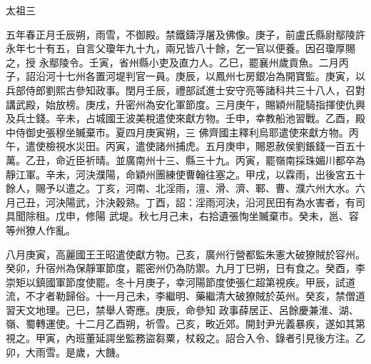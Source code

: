 
\begin{pinyinscope}

 太祖三



 五年春正月壬辰朔，雨雪，不御殿。禁鐵鑄浮屠及佛像。庚子，前盧氏縣尉鄢陵許永年七十有五，自言父瓊年九十九，兩兄皆八十餘，乞一官以便養。因召瓊厚賜之，授
 永鄢陵令。壬寅，省州縣小吏及直力人。乙巳，罷襄州歲貢魚。二月丙子，詔沿河十七州各置河堤判官一員。庚辰，以鳳州七房銀冶為開寶監。庚寅，以兵部侍郎劉熙古參知政事。閏月壬辰，禮部試進士安守亮等諸科共三十八人，召對講武殿，始放榜。庚戌，升密州為安化軍節度。三月庚午，賜穎州龍騎指揮使仇興及兵士錢。辛未，占城國王波美稅遣使來獻方物。壬申，幸教船池習戰。乙酉，殿中侍御史張穆坐贓棄市。夏四月庚寅朔，三
 佛齊國主釋利烏耶遣使來獻方物。丙午，遣使檢視水災田。丙寅，遣使諸州捕虎。五月庚申，賜恩赦侯劉鋹錢一百五十萬。乙丑，命近臣祈晴。並廣南州十三、縣三十九。丙寅，罷嶺南採珠媚川都卒為靜江軍。辛未，河決濮陽，命穎州團練使曹翰往塞之。甲戌，以霖雨，出後宮五十餘人，賜予以遣之。丁亥，河南、北淫雨，澶、滑、濟、鄆、曹、濮六州大水。六月己丑，河決陽武，汴決穀熟。丁酉，詔：淫雨河決，沿河民田有為水害者，有司具聞除租。戊申，修陽
 武堤。秋七月己未，右拾遺張恂坐贓棄市。癸未，邕、容等州獠人作亂。



 八月庚寅，高麗國王王昭遣使獻方物。己亥，廣州行營都監朱憲大破獠賊於容州。癸卯，升宿州為保靜軍節度，罷密州仍為防禦。九月丁巳朔，日有食之。癸酉，李崇矩以鎮國軍節度使罷。冬十月庚子，幸河陽節度使張仁超第視疾。甲辰，試道流，不才者勒歸俗。十一月己未，李繼明、藥繼清大破獠賊於英州。癸亥，禁僧道習天文地理。己巳，禁舉人寄應。庚辰，命參知
 政事薛居正、呂餘慶兼淮、湖、嶺、蜀轉運使。十二月乙酉朔，祈雪。己亥，畋近郊。開封尹光義暴疾，遂如其第視之。甲寅，內班董延諤坐監務盜芻粟，杖殺之。詔合入令、錄者引見後方注。乙卯，大雨雪。是歲，大饑。




\end{pinyinscope}
